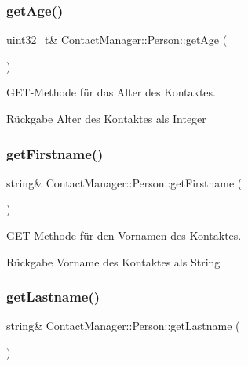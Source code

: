 \subsubsection{\texorpdfstring{get\+Age()}{getAge()}}
{\footnotesize\ttfamily uint32\+\_\+t\& Contact\+Manager\+::\+Person\+::get\+Age (\begin{DoxyParamCaption}{ }\end{DoxyParamCaption})\hspace{0.3cm}{\ttfamily [inline]}}



G\+E\+T-\/\+Methode für das Alter des Kontaktes.

\begin{DoxyReturn}{Rückgabe}
Alter des Kontaktes als Integer
\end{DoxyReturn}
\mbox{\label{classContactManager_1_1Person_abaf0c8225bed1c63d3fc8edf39c091cb}} 
\subsubsection{\texorpdfstring{get\+Firstname()}{getFirstname()}}
{\footnotesize\ttfamily string\& Contact\+Manager\+::\+Person\+::get\+Firstname (\begin{DoxyParamCaption}{ }\end{DoxyParamCaption})\hspace{0.3cm}{\ttfamily [inline]}}



G\+E\+T-\/\+Methode für den Vornamen des Kontaktes.

\begin{DoxyReturn}{Rückgabe}
Vorname des Kontaktes als String
\end{DoxyReturn}
\mbox{\label{classContactManager_1_1Person_a7be599e567469609abc206c4e20b1ef3}} 
\subsubsection{\texorpdfstring{get\+Lastname()}{getLastname()}}
{\footnotesize\ttfamily string\& Contact\+Manager\+::\+Person\+::get\+Lastname (\begin{DoxyParamCaption}{ }\end{DoxyParamCaption})\hspace{0.3cm}{\ttfamily [inline]}}



